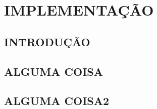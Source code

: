 \chapter{IMPLEMENTAÇÃO}\label{ch:implementacao}

\section{INTRODUÇÃO}
\section{ALGUMA COISA}
\section{ALGUMA COISA2}


















